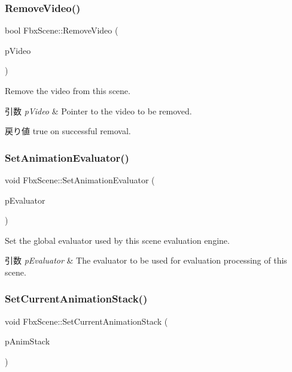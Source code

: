 \subsubsection{\texorpdfstring{Remove\+Video()}{RemoveVideo()}}
{\footnotesize\ttfamily bool Fbx\+Scene\+::\+Remove\+Video (\begin{DoxyParamCaption}\item[{\hyperlink{class_fbx_video}{Fbx\+Video} $\ast$}]{p\+Video }\end{DoxyParamCaption})}

Remove the video from this scene. 
\begin{DoxyParams}{引数}
{\em p\+Video} & Pointer to the video to be removed. \\
\hline
\end{DoxyParams}
\begin{DoxyReturn}{戻り値}
true on successful removal. 
\end{DoxyReturn}
\mbox{\label{class_fbx_scene_a7fd2f5602c943f1050488e379fc18755}} 
\subsubsection{\texorpdfstring{Set\+Animation\+Evaluator()}{SetAnimationEvaluator()}}
{\footnotesize\ttfamily void Fbx\+Scene\+::\+Set\+Animation\+Evaluator (\begin{DoxyParamCaption}\item[{\hyperlink{class_fbx_anim_evaluator}{Fbx\+Anim\+Evaluator} $\ast$}]{p\+Evaluator }\end{DoxyParamCaption})}

Set the global evaluator used by this scene evaluation engine. 
\begin{DoxyParams}{引数}
{\em p\+Evaluator} & The evaluator to be used for evaluation processing of this scene. \\
\hline
\end{DoxyParams}
\mbox{\label{class_fbx_scene_a19f5408a6460667dec584cd5363e3abe}} 
\subsubsection{\texorpdfstring{Set\+Current\+Animation\+Stack()}{SetCurrentAnimationStack()}}
{\footnotesize\ttfamily void Fbx\+Scene\+::\+Set\+Current\+Animation\+Stack (\begin{DoxyParamCaption}\item[{\hyperlink{class_fbx_anim_stack}{Fbx\+Anim\+Stack} $\ast$}]{p\+Anim\+Stack }\end{DoxyParamCaption})}

